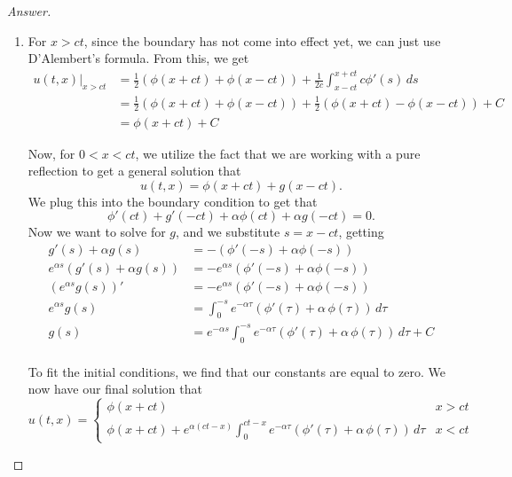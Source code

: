\documentclass{article}
\theoremstyle{definition}
\renewcommand\qedsymbol{$\blacksquare$}
\newenvironment{ans}{\begin{proof}[Answer]\renewcommand{\qedsymbol}{}}{\end{proof}}
\begin{document}
\begin{ans}
\begin{enumerate}
    \item For $x > ct$, since the boundary has not come into effect yet, we can just use D'Alembert's formula. From this, we get
    \begin{align*}
        u(t,x)|_{x > ct} &= \frac{1}{2}(\phi(x+ct) + \phi(x-ct)) + \frac{1}{2c}\int_{x-ct}^{x+ct}c\phi'(s)\,ds\\
        &= \frac{1}{2}(\phi(x+ct) + \phi(x-ct)) + \frac{1}{2}(\phi(x+ct) - \phi(x-ct)) + C\\
        &= \phi(x+ct) + C
    \end{align*}

    Now, for $0 < x < ct$, we utilize the fact that we are working with a pure reflection to get a general solution that
    \[u(t,x) = \phi(x+ct) + g(x-ct).\]
    We plug this into the boundary condition to get that
    \[\phi'(ct) + g'(-ct) + \alpha \phi(ct) + \alpha g(-ct) = 0.\]
    Now we want to solve for $g$, and we substitute $s = x-ct$, getting
    \begin{align*}
        g'(s) + \alpha g(s) &= -(\phi'(-s) + \alpha \phi(-s))\\
        e^{\alpha s}(g'(s) + \alpha g(s)) &= -e^{\alpha s}(\phi'(-s) + \alpha \phi(-s))\\
        (e^{\alpha s}g(s))' &= -e^{\alpha s}(\phi'(-s) + \alpha \phi(-s))\\
        e^{\alpha s}g(s) &= \int_0^{-s} e^{-\alpha\tau}(\phi'(\tau) + \alpha\, \phi(\tau))\,d\tau \tag{taking $\tau = -s$}\\
        g(s) &= e^{-\alpha s}\int_0^{-s} e^{-\alpha\tau}(\phi'(\tau) + \alpha\, \phi(\tau))\,d\tau + C\\
    \end{align*}

    To fit the initial conditions, we find that our constants are equal to zero. We now have our final solution that
    \[\boxed{u(t,x) = \begin{cases}
        \phi(x+ct) & x > ct\\
        \phi(x+ct) + e^{\alpha (ct-x)}\int_0^{ct-x} e^{-\alpha\tau}(\phi'(\tau) + \alpha\, \phi(\tau))\,d\tau & x < ct
    \end{cases}}\]


\end{enumerate}
\end{ans}
\end{document}
